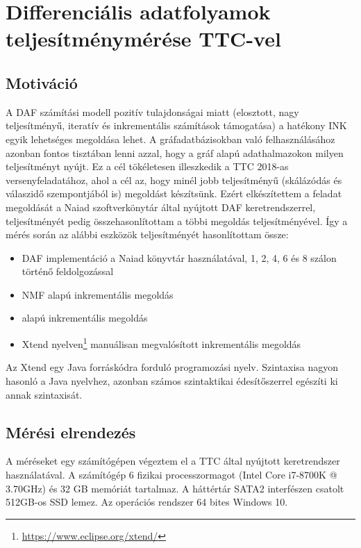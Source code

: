 \section{Differenciális adatfolyamok teljesítménymérése TTC-vel}

\subsection{Motiváció}

A DAF számítási modell pozitív tulajdonságai miatt (elosztott, nagy teljesítményű, iteratív és inkrementális számítások támogatása) a hatékony INK egyik lehetséges megoldása lehet. A gráfadatbázisokban való felhasználásához azonban fontos tisztában lenni azzal, hogy a gráf alapú adathalmazokon milyen teljesítményt nyújt. Ez a cél tökéletesen illeszkedik a TTC 2018-as versenyfeladatához, ahol a cél az, hogy minél jobb teljesítményű (skálázódás és válaszidő szempontjából is) megoldást készítsünk. Ezért elkészítettem a feladat megoldását a Naiad szoftverkönytár által nyújtott DAF keretrendszerrel, teljesítményét pedig összehasonlítottam a többi megoldás teljesítményével. Így a mérés során az alábbi eszközök teljesítményét hasonlítottam össze:
\begin{itemize}
	\item DAF implementáció a Naiad könyvtár használatával, 1, 2, 4, 6 és 8 szálon történő feldolgozással
	\item NMF alapú inkrementális megoldás
	\item \viatra alapú inkrementális megoldás
	\item Xtend nyelven\footnote{\url{https://www.eclipse.org/xtend/}} manuálisan megvalósított inkrementális megoldás
\end{itemize}
Az Xtend egy Java forráskódra forduló programozási nyelv. Szintaxisa nagyon hasonló a Java nyelvhez, azonban számos szintaktikai édesítőszerrel egészíti ki annak szintaxisát.

\subsection{Mérési elrendezés}\label{sec:naiad-layout}

A méréseket egy számítógépen végeztem el a TTC által nyújtott keretrendszer használatával. A számítógép 6 fizikai processzormagot (Intel Core i7-8700K @ 3.70GHz) és 32 GB memóriát tartalmaz. A háttértár SATA2 interfészen csatolt 512GB-os SSD lemez. Az operációs rendszer 64 bites Windows 10.

